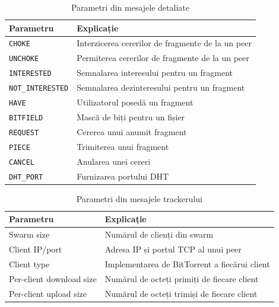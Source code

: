 \begin{table}[htb]
  \centering
  \caption{Parametri din mesajele detaliate}
  \label{tab:proto-measure:verbose-messages-params}
  \begin{tabular}{@{}ll@{}}
    \toprule
      \textbf{Parametru} & \textbf{Explicație} \\
    \midrule
      \texttt{CHOKE} & Interzicerea cererilor de fragmente de la un peer \\
      \texttt{UNCHOKE} & Permiterea cererilor de fragmente de la un peer \\
      \texttt{INTERESTED} & Semnalarea interesului pentru un fragment \\
      \texttt{NOT\_INTERESTED} & Semnalarea dezinteresului pentru un fragment \\
      \texttt{HAVE} & Utilizatorul posedă un fragment \\
      \texttt{BITFIELD} & Mască de biți pentru un fișier \\
      \texttt{REQUEST} & Cererea unui anumit fragment \\
      \texttt{PIECE} & Trimiterea unui fragment \\
      \texttt{CANCEL} & Anularea unei cereri \\
      \texttt{DHT\_PORT} & Furnizarea portului DHT \\
    \bottomrule
  \end{tabular}
\end{table}

\begin{table}[htb]
  \centering
  \caption{Parametri din mesajele trackerului}
  \label{tab:proto-measure:tracker-messages-params}
  \begin{tabular}{@{}ll@{}}
    \toprule
      \textbf{Parametru} & \textbf{Explicație} \\
    \midrule
    \midrule
      Swarm size & Numărul de clienți din swarm \\
      Client IP/port & Adresa IP și portul TCP al unui peer \\
      Client type & Implementarea de BitTorrent a fiecărui client \\
      Per-client download size & Numărul de octeți primiți de fiecare client \\
      Per-client upload size & Numărul de octeți trimiși de fiecare client \\
    \bottomrule
  \end{tabular}
\end{table}


